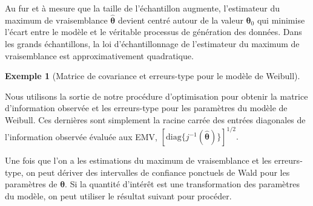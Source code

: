 \documentclass[
  11pt,
  letterpaper,
]{scrbook}
\newenvironment{Shaded}{\begin{snugshade}}{\end{snugshade}}
\newcommand{\CommentTok}[1]{\textcolor[rgb]{0.37,0.37,0.37}{#1}}
\newcommand{\FunctionTok}[1]{\textcolor[rgb]{0.28,0.35,0.67}{#1}}
\newcommand{\NormalTok}[1]{\textcolor[rgb]{0.00,0.23,0.31}{#1}}
\newcommand{\OtherTok}[1]{\textcolor[rgb]{0.00,0.23,0.31}{#1}}
\newcommand{\SpecialCharTok}[1]{\textcolor[rgb]{0.37,0.37,0.37}{#1}}
\theoremstyle{plain}
\theoremstyle{plain}
\theoremstyle{definition}
\newtheorem{example}{Exemple}[chapter]
\theoremstyle{definition}
\theoremstyle{remark}
\begin{document}
Au fur et à mesure que la taille de l'échantillon augmente, l'estimateur
du maximum de vraisemblance \(\widehat{\boldsymbol{\theta}}\) devient
centré autour de la valeur \(\boldsymbol{\theta}_0\) qui minimise
l'écart entre le modèle et le véritable processus de génération des
données. Dans les grands échantillons, la loi d'échantillonnage de
l'estimateur du maximum de vraisemblance est approximativement
quadratique.

\begin{example}[Matrice de covariance et erreurs-type pour le modèle de
Weibull]\protect\hypertarget{exm-Weibull-se}{}\label{exm-Weibull-se}

Nous utilisons la sortie de notre procédure d'optimisation pour obtenir
la matrice d'information observée et les erreurs-type pour les
paramètres du modèle de Weibull. Ces dernières sont simplement la racine
carrée des entrées diagonales de l'information observée évaluée aux EMV,
\([\mathrm{diag}\{j^{-1}(\widehat{\boldsymbol{\theta}})\}]^{1/2}.\)

\begin{Shaded}
\end{Shaded}

\end{example}

Une fois que l'on a les estimations du maximum de vraisemblance et les
erreurs-type, on peut dériver des intervalles de confiance ponctuels de
Wald pour les paramètres de \(\boldsymbol{\theta}.\) Si la quantité
d'intérêt est une transformation des paramètres du modèle, on peut
utiliser le résultat suivant pour procéder.
\end{document}
